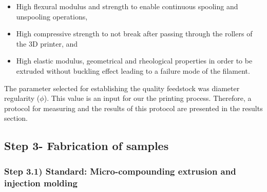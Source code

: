 \begin{enumerate}[leftmargin=0in, label=\emph{\alph*}.]
	\begin{itemize}
		\item High flexural modulus and strength to enable continuous spooling and  unspooling operations, 
		\item High compressive strength to not break after passing through the rollers of the 3D printer, and 
		\item High elastic modulus, geometrical and rheological properties in order to be extruded without buckling effect leading to a failure mode of the filament. 
		
	\end{itemize}

The parameter selected for establishing the quality feedstock was diameter regularity ($\phi$). 
This value is an input for our the printing process.
Therefore, a protocol for measuring and the results of this protocol are presented in the results section.

\end{enumerate}





\newpage
\subsection{Step 3- Fabrication of samples} 
\label{Fabrication.samples}

\subsubsection{Step 3.1) Standard: Micro-compounding extrusion and injection molding}
\label{Sub:Fabrication.samples.reference}


